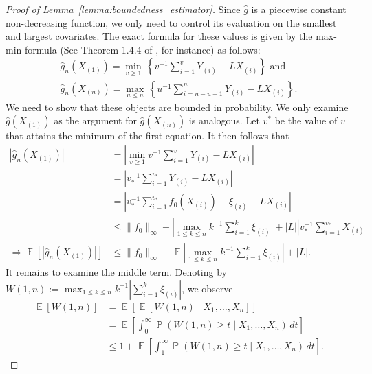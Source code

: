 \documentclass[12pt]{article}
\DeclareMathOperator*{\E}{\mathbb{E}}
\DeclareMathOperator*{\Prob}{\mathbb{P}}
\begin{document}
\begin{appendices}
\begin{proof}[Proof of Lemma~\ref{lemma:boundedness_estimator}]
Since $\widehat g$ is a piecewise constant non-decreasing function, we only need to control its evaluation on the smallest and largest covariates. The exact formula for these values is given by the max-min formula (See Theorem 1.4.4 of \cite{robertson1988order}, for instance) as follows:
\begin{equation}\nonumber
\begin{aligned}
   \widehat g_n(X_{(1)}) = \min_{v \geq 1}\, \left\{v^{-1}\sum_{i=1}^v Y_{(i)} - LX_{(i)}\right\}\textrm{ and }\\
    \widehat g_n(X_{(n)}) = \max_{u \leq n}\, \left\{u^{-1}\sum_{i=n-u+1}^n Y_{(i)} - LX_{(i)}\right\}.
\end{aligned}
 \end{equation}
We need to show that these objects are bounded in probability. We only examine $\widehat g(X_{(1)})$ as the argument for $\widehat g(X_{(n)})$ is analogous. Let $v^*$ be the value of $v$ that attains the minimum of the first equation. It then follows that
\begin{equation}
\label{bound on minimal value}
\begin{aligned}
    \left|\widehat g_n(X_{(1)})\right| & = \left|\min_{v \geq 1}v^{-1}\sum_{i=1}^v Y_{(i)} - LX_{(i)}\right| \\
    & = \left|v^{-1}_*\sum_{i=1}^{v_*} Y_{(i)} - LX_{(i)}\right|\\
    & = \left|v^{-1}_*\sum_{i=1}^{v_*} f_0(X_{(i)}) + \xi_{(i)} - LX_{(i)}\right|\\
    & \leq \|f_0\|_\infty +  \left|\max_{1\leq k \leq n}k^{-1}\sum_{i=1}^{k}\xi_{(i)} \right|  
    + |L| \left|v^{-1}_*\sum_{i=1}^{v_*}X_{(i)}\right| \\ 
    \Longrightarrow \E\left[ \left|\widehat g_n(X_{(1)})\right|\right]& \leq \|f_0\|_\infty +  \E\left|\max_{1\leq k \leq n}k^{-1}\sum_{i=1}^{k}\xi_{(i)} \right|\nonumber 
    + |L| .
\end{aligned}
\end{equation}
It remains to examine the middle term. Denoting by $W(1,n) := \max_{1 \leq k \leq n} k^{-1}\left|\sum_{i=1}^{k} \xi_{(i)}\right |$, we observe 
\begin{equation}
\label{relate expectation to probabilit w1n}
\begin{aligned}
    \E[W(1,n)] & = \E[\E[W(1,n) \mid X_1,\ldots,X_n]] \\
    & = \E\left[\int_0^\infty \Prob(W(1,n) \geq t \mid X_1,\ldots,X_n)\, dt \right]\\
    & \leq 1 + \E\left[\int_1^\infty \Prob(W(1,n) \geq t \mid X_1,\ldots,X_n)\, dt \right].

\end{aligned}
\end{equation}
\end{proof}
\end{appendices}
\end{document}
